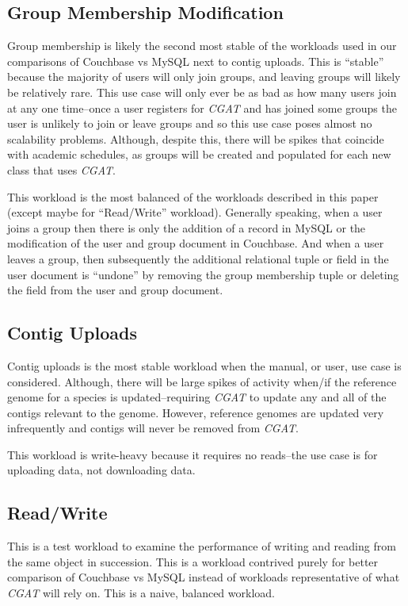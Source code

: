 \documentclass[]{IEEEtran}
\begin{document}
\subsection{Group Membership Modification}
Group membership is likely the second most stable of the workloads used in our
comparisons of Couchbase vs MySQL next to contig uploads. This is ``stable''
because the majority of users will only join groups, and leaving groups will
likely be relatively rare. This use case will only ever be as bad as how many
users join at any one time--once a user registers for \textit{CGAT} and has
joined some groups the user is unlikely to join or leave groups and so this use
case poses almost no scalability problems. Although, despite this, there will
be spikes that coincide with academic schedules, as groups will be created and
populated for each new class that uses \textit{CGAT}.

This workload is the most balanced of the workloads described in this paper
(except maybe for ``Read/Write'' workload). Generally speaking, when a user joins a
group then there is only the addition of a record in MySQL or the modification
of the user and group document in Couchbase. And when a user leaves a group, then
subsequently the additional relational tuple or field in the user document is
``undone'' by removing the group membership tuple or deleting the field from
the user and group document.

\subsection{Contig Uploads}
Contig uploads is the most stable workload when the manual, or user, use case
is considered. Although, there will be large spikes of activity when/if the
reference genome for a species is updated--requiring \textit{CGAT} to update
any and all of the contigs relevant to the genome. However, reference genomes
are updated very infrequently and contigs will never be removed from
\textit{CGAT}.

This workload is write-heavy because it requires no reads--the use case is for
uploading data, not downloading data.

\subsection{Read/Write}
This is a test workload to examine the performance of writing and reading from
the same object in succession. This is a workload contrived purely for better
comparison of Couchbase vs MySQL instead of workloads representative of what
\textit{CGAT} will rely on. This is a naive, balanced workload.
\end{document}
